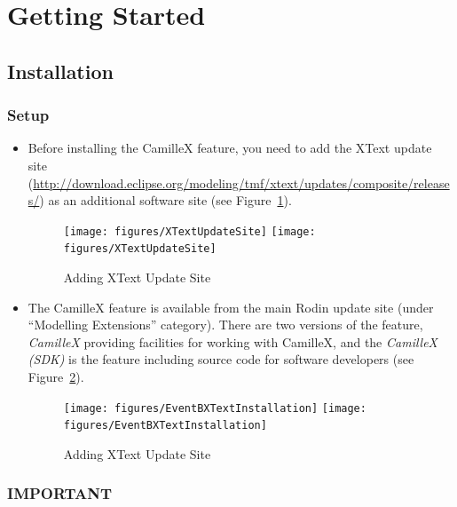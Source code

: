 \section{Getting Started}
\label{sec:getting-started}

\subsection{Installation}
\label{sec:installation}

\subsubsection{Setup}
\label{sec:setup}

\begin{itemize}
\item Before installing the CamilleX feature, you need to add the XText update site (\url{http://download.eclipse.org/modeling/tmf/xtext/updates/composite/releases/}) as an additional software site (see Figure~\ref{fig:xtext-updatesite}).
\begin{figure}[!htbp]
  \centering
  \texttt{[image: figures/XTextUpdateSite]}
  \else
  \texttt{[image: figures/XTextUpdateSite]}
  \endif
  \caption{Adding XText Update Site}
  \label{fig:xtext-updatesite}
\end{figure}


\item The CamilleX feature is available from the main Rodin update site (under ``Modelling Extensions'' category). There are two versions of the feature, \emph{CamilleX} providing facilities for working with CamilleX, and the \emph{CamilleX (SDK)} is the feature including source code for software developers (see Figure~\ref{fig:EventBXText-installation}).
\begin{figure}[!htbp]
  \centering
  \texttt{[image: figures/EventBXTextInstallation]}
  \else
  \texttt{[image: figures/EventBXTextInstallation]}
  \endif
  \caption{Adding XText Update Site}
  \label{fig:EventBXText-installation}
\end{figure}

\end{itemize}

\subsubsection{IMPORTANT}
\label{sec:important}

